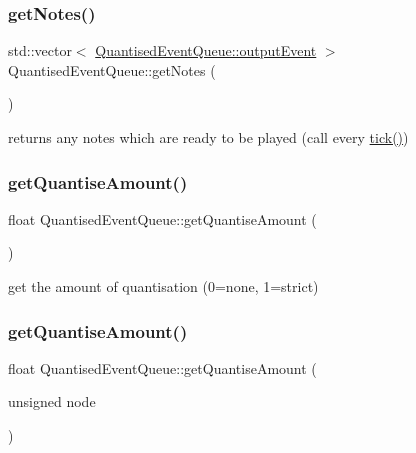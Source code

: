 \mbox{\label{classQuantisedEventQueue_ae3ec71da38982933666fb17dde454709}} 
\subsubsection{\texorpdfstring{get\+Notes()}{getNotes()}}
{\footnotesize\ttfamily std\+::vector$<$ \mbox{\hyperlink{structQuantisedEventQueue_1_1outputEvent}{Quantised\+Event\+Queue\+::output\+Event}} $>$ Quantised\+Event\+Queue\+::get\+Notes (\begin{DoxyParamCaption}{ }\end{DoxyParamCaption})}



returns any notes which are ready to be played (call every \mbox{\hyperlink{classQuantisedEventQueue_a97055bead1291aef1d540640fcb61bf9}{tick()}}) 

\mbox{\label{classQuantisedEventQueue_aaef3b89d1b622c3a2b3a96862d55f12d}} 
\subsubsection{\texorpdfstring{get\+Quantise\+Amount()}{getQuantiseAmount()}\hspace{0.1cm}{\footnotesize\ttfamily [1/2]}}
{\footnotesize\ttfamily float Quantised\+Event\+Queue\+::get\+Quantise\+Amount (\begin{DoxyParamCaption}{ }\end{DoxyParamCaption})}



get the amount of quantisation (0=none, 1=strict) 

\mbox{\label{classQuantisedEventQueue_a009ee8815cadef590721c7c20edf57d6}} 
\subsubsection{\texorpdfstring{get\+Quantise\+Amount()}{getQuantiseAmount()}\hspace{0.1cm}{\footnotesize\ttfamily [2/2]}}
{\footnotesize\ttfamily float Quantised\+Event\+Queue\+::get\+Quantise\+Amount (\begin{DoxyParamCaption}\item[{unsigned}]{node }\end{DoxyParamCaption})}

